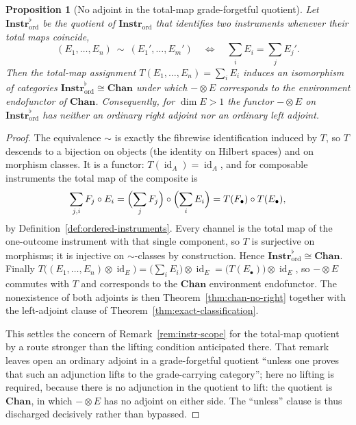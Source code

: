 \documentclass[11pt]{article}
\newtheorem{proposition}[theorem]{Proposition}
\DeclareMathOperator{\id}{id}
\begin{document}
\begin{proposition}[No adjoint in the total-map grade-forgetful quotient]
\label{prop:grade-forgetful-total}
Let $\mathbf{Instr}_{\mathrm{ord}}^{\flat}$ be the quotient of
$\mathbf{Instr}_{\mathrm{ord}}$ that identifies two instruments whenever their
total maps coincide,
\[
(E_1,\dots,E_n)\ \sim\ (E_1',\dots,E_m')
\quad\Longleftrightarrow\quad
\sum_i E_i=\sum_j E_j' .
\]
Then the total-map assignment
$T(E_1,\dots,E_n)=\sum_i E_i$ induces an isomorphism of categories
$\mathbf{Instr}_{\mathrm{ord}}^{\flat}\cong\mathbf{Chan}$ under which
$-\otimes E$ corresponds to the environment endofunctor of $\mathbf{Chan}$.
Consequently, for $\dim E>1$ the functor $-\otimes E$ on
$\mathbf{Instr}_{\mathrm{ord}}^{\flat}$ has neither an ordinary right adjoint
nor an ordinary left adjoint.
\end{proposition}

\begin{proof}
The equivalence $\sim$ is exactly the fibrewise identification induced by $T$,
so $T$ descends to a bijection on objects (the identity on Hilbert spaces) and
on morphism classes. It is a functor: $T(\id_A)=\id_A$, and for composable
instruments the total map of the composite is
\[
\sum_{j,i}F_j\circ E_i
=\Bigl(\sum_j F_j\Bigr)\circ\Bigl(\sum_i E_i\Bigr)
=T(F_\bullet)\circ T(E_\bullet),
\]
by Definition~\ref{def:ordered-instruments}. Every channel is the total map of
the one-outcome instrument with that single component, so $T$ is surjective on
morphisms; it is injective on $\sim$-classes by construction. Hence
$\mathbf{Instr}_{\mathrm{ord}}^{\flat}\cong\mathbf{Chan}$. Finally
$T\bigl((E_1,\dots,E_n)\otimes\id_E\bigr)=\bigl(\sum_i E_i\bigr)\otimes\id_E
=\bigl(T(E_\bullet)\bigr)\otimes\id_E$, so $-\otimes E$ commutes with $T$ and
corresponds to the $\mathbf{Chan}$ environment endofunctor. The nonexistence of
both adjoints is then Theorem~\ref{thm:chan-no-right} together with the
left-adjoint clause of Theorem~\ref{thm:exact-classification}.

This settles the concern of Remark~\ref{rem:instr-scope} for the total-map
quotient by a route stronger than the lifting condition anticipated there. That
remark leaves open an ordinary adjoint in a grade-forgetful quotient ``unless
one proves that such an adjunction lifts to the grade-carrying category''; here
no lifting is required, because there is no adjunction in the quotient to lift:
the quotient is $\mathbf{Chan}$, in which $-\otimes E$ has no adjoint on either
side. The ``unless'' clause is thus discharged decisively rather than bypassed.
\end{proof}
\end{document}
